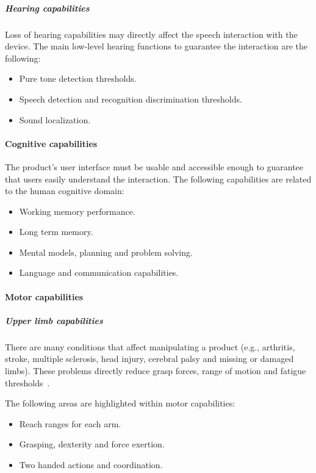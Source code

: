 \subparagraph*{Hearing capabilities} Loss of hearing capabilities may directly 
affect the speech interaction with the device. The main low-level hearing 
functions to guarantee the interaction are the following:

\begin{itemize}
  \item Pure tone detection thresholds.
  \item Speech detection and recognition discrimination thresholds.
  \item Sound localization.
\end{itemize}


\paragraph*{Cognitive capabilities}
The product's user interface must be usable and accessible enough to guarantee 
that users easily understand the interaction. The following capabilities are 
related to the human cognitive domain:

\begin{itemize}
 \item Working memory performance.
 \item Long term memory.
 \item Mental models, planning and problem solving.
 \item Language and communication capabilities.
\end{itemize}

\paragraph*{Motor capabilities}
\subparagraph*{Upper limb capabilities}
There are many conditions that affect manipulating a product (e.g., arthritis, 
stroke, multiple sclerosis, head injury, cerebral palsy and missing or damaged 
limbs). These problems directly reduce grasp forces, range of motion and fatigue 
thresholds~\cite{persad_characterising_2007}.

The following areas are highlighted within motor capabilities:
\begin{itemize}
  \item Reach ranges for each arm.
  \item Grasping, dexterity and force exertion.
  \item Two handed actions and coordination.
\end{itemize}

